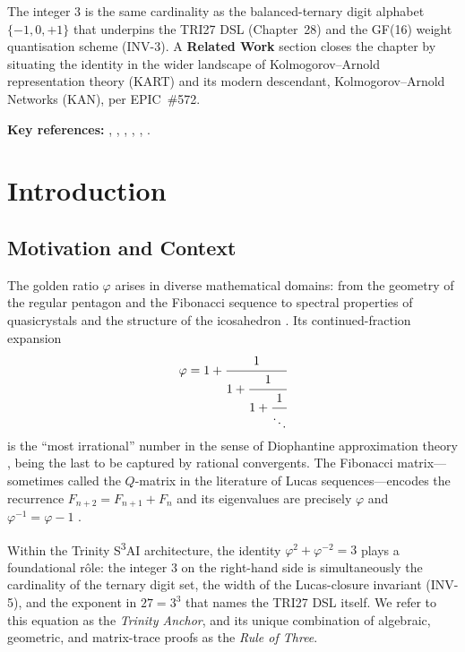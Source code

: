 The integer $3$ is the same cardinality as the balanced-ternary
digit alphabet $\{-1,0,+1\}$ that underpins the TRI27 DSL
(Chapter~28) and the GF(16) weight quantisation scheme (INV-3).
A \textbf{Related Work} section closes the chapter by situating
the identity in the wider landscape of Kolmogorov--Arnold
representation theory (KART) and its modern descendant,
Kolmogorov--Arnold Networks (KAN), per EPIC~\#572.

\medskip
\noindent\textbf{Key references:}
\cite{koshy_fib_lucas},
\cite{olds_pell},
\cite{vajda_fib_lucas},
\cite{kolmogorov_kar_1957},
\cite{arnold_kar_1957},
\cite{liu_kan2_2025}.


\section{Introduction}\label{sec:trinity-intro}

\subsection{Motivation and Context}

The golden ratio $\varphi$ arises in diverse mathematical domains:
from the geometry of the regular pentagon and the Fibonacci
sequence to spectral properties of quasicrystals and the structure
of the icosahedron \cite{koshy_fib_lucas}.
Its continued-fraction expansion
\[
  \varphi = 1 + \cfrac{1}{1 + \cfrac{1}{1 + \cfrac{1}{\ddots}}}
\]
is the ``most irrational'' number in the sense of Diophantine
approximation theory \cite{olds_pell}, being the last to be
captured by rational convergents.
The Fibonacci matrix---sometimes called the $Q$-matrix in the
literature of Lucas sequences---encodes the recurrence
$F_{n+2}=F_{n+1}+F_{n}$ and its eigenvalues are precisely
$\varphi$ and $\varphi^{-1} = \varphi - 1$
\cite{vajda_fib_lucas}.

Within the Trinity S\textsuperscript{3}AI architecture, the
identity $\varphi^{2}+\varphi^{-2}=3$ plays a foundational
r\^{o}le: the integer $3$ on the right-hand side is simultaneously
the cardinality of the ternary digit set, the width of the
Lucas-closure invariant (INV-5), and the exponent in $27=3^{3}$
that names the TRI27 DSL itself.
We refer to this equation as the \emph{Trinity Anchor}, and its
unique combination of algebraic, geometric, and matrix-trace
proofs as the \emph{Rule of Three}.

